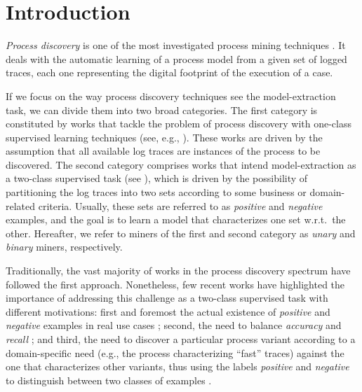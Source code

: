 

\section{Introduction}
\label{sec:introduction}

\emph{Process discovery} is one of the most investigated process mining techniques \cite{2012-Aalst}. It deals with the automatic learning of a process model from a given set of logged traces, each one representing the digital footprint of the execution of a case.

If we focus on the way process discovery techniques see the model-extraction task, we can divide them into two broad categories. %
The first category is constituted by works that tackle the problem of process discovery with one-class supervised learning techniques (see, e.g., \cite{2010-Aalst,2004-Aalst,2007-Gunther,2003-Weijters}). These works are driven by the assumption that all available log traces are instances of the process to be discovered. The second category comprises works that intend model-extraction as a two-class supervised task (see \cite{2009-Chesani,2009-Goedertier,2006-Maruster}), which is driven by the possibility of partitioning the log traces into two sets according to some business or domain-related criteria. Usually, these sets are referred to as \emph{positive} and \emph{negative} examples, and the goal is to learn a model that characterizes one set w.r.t.\ the other. Hereafter, we refer to miners of the first and second category as \emph{unary} and \emph{binary} miners, respectively. 

Traditionally, the vast majority of works in the process discovery spectrum have followed the first approach. Nonetheless, few recent works \cite{deviant-tkde,2018-Ponce,DBLP:conf/bpm/SlaatsDB21} have highlighted the importance of addressing this challenge as a two-class supervised task with different motivations: first and foremost the actual existence of \emph{positive} and \emph{negative} examples in real use cases \cite{2018-Ponce,DBLP:conf/bpm/SlaatsDB21}; second, the need to balance \emph{accuracy} and \emph{recall} \cite{DBLP:conf/bpm/SlaatsDB21}; and third, the need to discover a particular process variant according to a domain-specific need (e.g., the process characterizing ``fast'' traces) against the one that characterizes other variants, thus using the labels \emph{positive} and \emph{negative} to distinguish between two classes of examples \cite{deviant-tkde}.  

